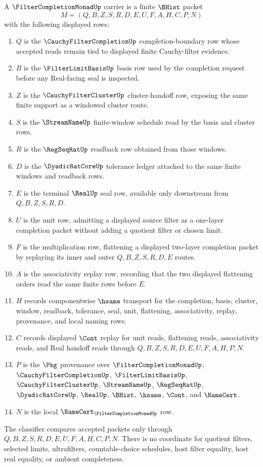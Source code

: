 \begin{definition}
\label{def:cauchy-completion-filter-monad-carrier}
A $\FilterCompletionMonadUp$ carrier is a finite $\BHist$ packet
$$
M=(Q,B,Z,S,R,D,E,U,F,A,H,C,P,N)
$$
with the following displayed rows:
\begin{enumerate}
\item $Q$ is the $\CauchyFilterCompletionUp$ completion-boundary row whose accepted reads remain tied to displayed finite Cauchy-filter evidence.
\item $B$ is the $\FilterLimitBasisUp$ basis row used by the completion request before any Real-facing seal is inspected.
\item $Z$ is the $\CauchyFilterClusterUp$ cluster-handoff row, exposing the same finite support as a windowed cluster route.
\item $S$ is the $\StreamNameUp$ finite-window schedule read by the basis and cluster rows.
\item $R$ is the $\RegSeqRatUp$ readback row obtained from those windows.
\item $D$ is the $\DyadicRatCoreUp$ tolerance ledger attached to the same finite windows and readback rows.
\item $E$ is the terminal $\RealUp$ seal row, available only downstream from $Q,B,Z,S,R,D$.
\item $U$ is the unit row, admitting a displayed source filter as a one-layer completion packet without adding a quotient filter or chosen limit.
\item $F$ is the multiplication row, flattening a displayed two-layer completion packet by replaying its inner and outer $Q,B,Z,S,R,D,E$ routes.
\item $A$ is the associativity replay row, recording that the two displayed flattening orders read the same finite rows before $E$.
\item $H$ records componentwise $\hsame$ transport for the completion, basis, cluster, window, readback, tolerance, seal, unit, flattening, associativity, replay, provenance, and local naming rows.
\item $C$ records displayed $\Cont$ replay for unit reads, flattening reads, associativity reads, and Real handoff reads through $Q,B,Z,S,R,D,E,U,F,A,H,P,N$.
\item $P$ is the $\Pkg$ provenance over $\FilterCompletionMonadUp$, $\CauchyFilterCompletionUp$, $\FilterLimitBasisUp$, $\CauchyFilterClusterUp$, $\StreamNameUp$, $\RegSeqRatUp$, $\DyadicRatCoreUp$, $\RealUp$, $\BHist$, $\hsame$, $\Cont$, and $\NameCert$.
\item $N$ is the local $\NameCert_{\FilterCompletionMonadUp}$ row.
\end{enumerate}
The classifier compares accepted packets only through $Q,B,Z,S,R,D,E,U,F,A,H,C,P,N$. There is no coordinate for quotient filters, selected limits, ultrafilters, countable-choice schedules, host filter equality, host real equality, or ambient completeness.
\end{definition}

